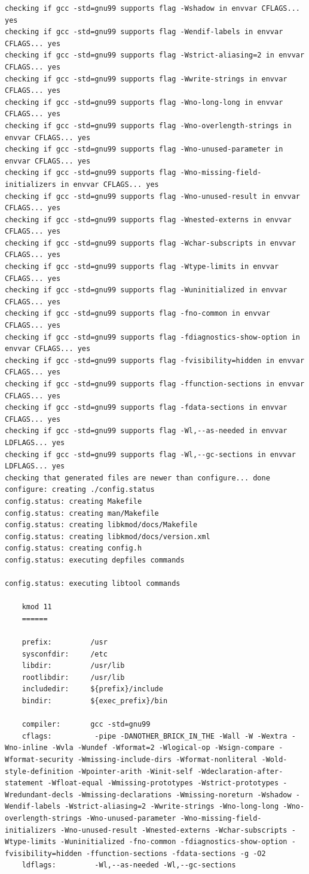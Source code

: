 {\begin{shaded}
\begin{verbatim}
checking if gcc -std=gnu99 supports flag -Wshadow in envvar CFLAGS... yes
checking if gcc -std=gnu99 supports flag -Wendif-labels in envvar CFLAGS... yes
checking if gcc -std=gnu99 supports flag -Wstrict-aliasing=2 in envvar CFLAGS... yes
checking if gcc -std=gnu99 supports flag -Wwrite-strings in envvar CFLAGS... yes
checking if gcc -std=gnu99 supports flag -Wno-long-long in envvar CFLAGS... yes
checking if gcc -std=gnu99 supports flag -Wno-overlength-strings in envvar CFLAGS... yes
checking if gcc -std=gnu99 supports flag -Wno-unused-parameter in envvar CFLAGS... yes
checking if gcc -std=gnu99 supports flag -Wno-missing-field-initializers in envvar CFLAGS... yes
checking if gcc -std=gnu99 supports flag -Wno-unused-result in envvar CFLAGS... yes
checking if gcc -std=gnu99 supports flag -Wnested-externs in envvar CFLAGS... yes
checking if gcc -std=gnu99 supports flag -Wchar-subscripts in envvar CFLAGS... yes
checking if gcc -std=gnu99 supports flag -Wtype-limits in envvar CFLAGS... yes
checking if gcc -std=gnu99 supports flag -Wuninitialized in envvar CFLAGS... yes
checking if gcc -std=gnu99 supports flag -fno-common in envvar CFLAGS... yes
checking if gcc -std=gnu99 supports flag -fdiagnostics-show-option in envvar CFLAGS... yes
checking if gcc -std=gnu99 supports flag -fvisibility=hidden in envvar CFLAGS... yes
checking if gcc -std=gnu99 supports flag -ffunction-sections in envvar CFLAGS... yes
checking if gcc -std=gnu99 supports flag -fdata-sections in envvar CFLAGS... yes
checking if gcc -std=gnu99 supports flag -Wl,--as-needed in envvar LDFLAGS... yes
checking if gcc -std=gnu99 supports flag -Wl,--gc-sections in envvar LDFLAGS... yes
checking that generated files are newer than configure... done
configure: creating ./config.status
config.status: creating Makefile
config.status: creating man/Makefile
config.status: creating libkmod/docs/Makefile
config.status: creating libkmod/docs/version.xml
config.status: creating config.h
config.status: executing depfiles commands

config.status: executing libtool commands

    kmod 11
    ======

    prefix:         /usr
    sysconfdir:     /etc
    libdir:         /usr/lib
    rootlibdir:     /usr/lib
    includedir:     ${prefix}/include
    bindir:         ${exec_prefix}/bin

    compiler:       gcc -std=gnu99
    cflags:          -pipe -DANOTHER_BRICK_IN_THE -Wall -W -Wextra -Wno-inline -Wvla -Wundef -Wformat=2 -Wlogical-op -Wsign-compare -Wformat-security -Wmissing-include-dirs -Wformat-nonliteral -Wold-style-definition -Wpointer-arith -Winit-self -Wdeclaration-after-statement -Wfloat-equal -Wmissing-prototypes -Wstrict-prototypes -Wredundant-decls -Wmissing-declarations -Wmissing-noreturn -Wshadow -Wendif-labels -Wstrict-aliasing=2 -Wwrite-strings -Wno-long-long -Wno-overlength-strings -Wno-unused-parameter -Wno-missing-field-initializers -Wno-unused-result -Wnested-externs -Wchar-subscripts -Wtype-limits -Wuninitialized -fno-common -fdiagnostics-show-option -fvisibility=hidden -ffunction-sections -fdata-sections -g -O2
    ldflags:         -Wl,--as-needed -Wl,--gc-sections 


\end{verbatim}
\end{shaded}}
